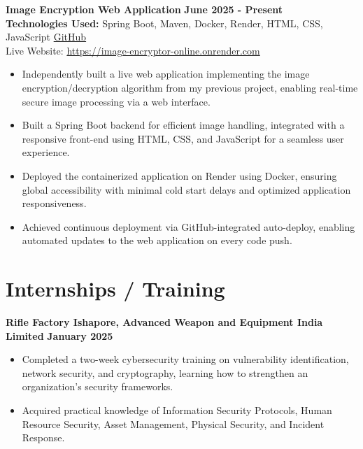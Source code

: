 \documentclass[a4paper,10pt]{article}
\begin{document}
\vspace{0.5em}


\textbf{Image Encryption Web Application} \hfill {\textbf{June 2025 - Present}}\\[0.5em]
\textbf{Technologies Used:} Spring Boot, Maven, Docker, Render, HTML, CSS, JavaScript \hfill {\href{https://github.com/subhrasmit17/Image-Encryption-Online}{GitHub}}\\[0.5em]
Live Website: \href{https://image-encryptor-online.onrender.com}{https://image-encryptor-online.onrender.com}

\begin{itemize}[leftmargin=*]
    \item Independently built a live web application implementing the image encryption/decryption algorithm from my previous project, enabling real-time secure image processing via a web interface.
    \item Built a Spring Boot backend for efficient image handling, integrated with a responsive front-end using HTML, CSS, and JavaScript for a seamless user experience.
    \item Deployed the containerized application on Render using Docker, ensuring global accessibility with minimal cold start delays and optimized application responsiveness.
    \item Achieved continuous deployment via GitHub-integrated auto-deploy, enabling automated updates to the web application on every code push.
\end{itemize}






\section*{Internships / Training}
\vspace{0.1em}
\textbf{Rifle Factory Ishapore, Advanced Weapon and Equipment India Limited} \hfill {\textbf{January 2025}}\\[-1.4em]

\begin{itemize}[leftmargin=*]
    \item Completed a two-week cybersecurity training on vulnerability identification, network security, and cryptography, learning how to strengthen an organization’s security frameworks.
    \item Acquired practical knowledge of Information Security Protocols, Human Resource Security, Asset Management, Physical Security, and Incident Response.
\end{itemize}
\end{document}
